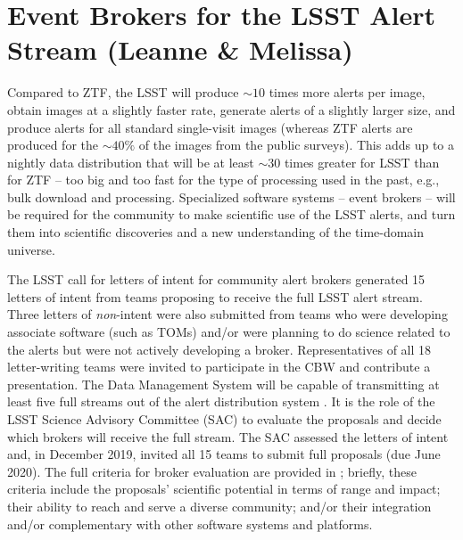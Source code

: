\section{Event Brokers for the \gls{LSST} \gls{Alert} Stream (Leanne \& Melissa)} \label{sec:lsstbrokers}


Compared to \gls{ZTF}, the \gls{LSST} will produce $\sim10$ times more alerts per image, obtain images at a slightly faster rate, generate alerts of a slightly larger size, and produce alerts for all standard single-visit images (whereas \gls{ZTF} alerts are produced for the $\sim40\%$ of the images from the public surveys).
This adds up to a nightly data distribution that will be at least $\sim30$ times greater for \gls{LSST} than for \gls{ZTF} -- too big and too fast for the type of processing used in the past, e.g., bulk download and processing.
Specialized software systems -- event brokers -- will be required for the community to make scientific use of the \gls{LSST} alerts, and turn them into scientific discoveries and a new understanding of the time-domain universe.

The \gls{LSST} call for letters of intent for community alert brokers \citep{LDM-682} generated 15 letters of intent from teams proposing to receive the full \gls{LSST} alert stream.
Three letters of {\it non}-intent were also submitted from teams who were developing associate software (such as TOMs) and/or were planning to do science related to the alerts but were not actively developing a broker.
Representatives of all 18 letter-writing teams were invited to participate in the \gls{CBW} and contribute a presentation.
The \gls{Data Management System} will be capable of transmitting at least five full streams out of the alert distribution system \citep{LSE-61}.
It is the role of the \gls{LSST} \gls{Science Advisory Committee} (\gls{SAC}) to evaluate the proposals and decide which brokers will receive the full stream.
The \gls{SAC} assessed the letters of intent and, in December 2019, invited all 15 teams to submit full proposals (due June 2020).
The full criteria for broker evaluation are provided in \citet{LDM-612}; briefly, these criteria include the proposals' scientific potential in terms of range and impact; their ability to reach and serve a diverse community; and/or their integration and/or complementary with other software systems and platforms. 

